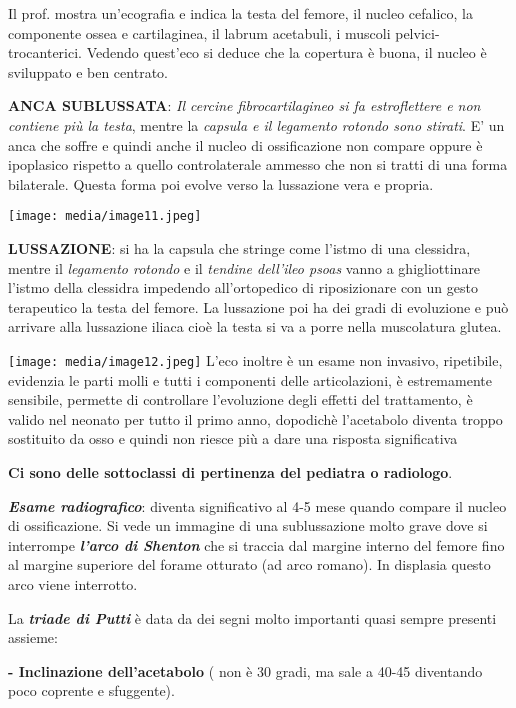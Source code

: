 \documentclass[]{article}
\begin{document}
Il prof. mostra un'ecografia e indica la testa del femore, il nucleo
cefalico, la componente ossea e cartilaginea, il labrum acetabuli, i
muscoli pelvici-trocanterici. Vedendo quest'eco si deduce che la
copertura è buona, il nucleo è sviluppato e ben centrato.

\textbf{ANCA SUBLUSSATA}: \emph{Il cercine fibrocartilagineo si fa
estroflettere e non contiene più la testa}, mentre la \emph{capsula e il
legamento rotondo sono stirati}. E' un anca che soffre e quindi anche il
nucleo di ossificazione non compare oppure è ipoplasico rispetto a
quello controlaterale ammesso che non si tratti di una forma bilaterale.
Questa forma poi evolve verso la lussazione vera e propria.

\texttt{[image: media/image11.jpeg]}

\textbf{LUSSAZIONE}: si ha la capsula che stringe come l'istmo di una
clessidra, mentre il \emph{legamento rotondo} e il \emph{tendine
dell'ileo psoas} vanno a ghigliottinare l'istmo della clessidra
impedendo all'ortopedico di riposizionare con un gesto terapeutico la
testa del femore. La lussazione poi ha dei gradi di evoluzione e può
arrivare alla lussazione iliaca cioè la testa si va a porre nella
muscolatura glutea.

\texttt{[image: media/image12.jpeg]}
L'eco inoltre è un esame non invasivo, ripetibile, evidenzia le parti
molli e tutti i componenti delle articolazioni, è estremamente
sensibile, permette di controllare l'evoluzione degli effetti del
trattamento, è valido nel neonato per tutto il primo anno, dopodichè
l'acetabolo diventa troppo sostituito da osso e quindi non riesce più a
dare una risposta significativa

\textbf{Ci sono delle sottoclassi di pertinenza del pediatra o
radiologo}.

\textbf{\emph{Esame radiografico}}: diventa significativo al 4-5 mese
quando compare il nucleo di ossificazione. Si vede un immagine di una
sublussazione molto grave dove si interrompe \emph{\textbf{l'arco di
Shenton}} che si traccia dal margine interno del femore fino al margine
superiore del forame otturato (ad arco romano). In displasia questo arco
viene interrotto.

La \emph{\textbf{\emph{triade di Putti}}} è data da dei segni molto
importanti quasi sempre presenti assieme:

\textbf{- Inclinazione dell'acetabolo} ( non è 30 gradi, ma sale a 40-45
diventando poco coprente e sfuggente).
\end{document}
